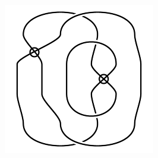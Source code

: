 \begin{figure}[H]
\begin{minipage}[b]{.18\linewidth}
\end{minipage}
\begin{minipage}[b]{.18\linewidth}
\centering
\includegraphics[width=\linewidth]{../data/virtual_4_76.png}
\end{minipage}
\end{figure}

